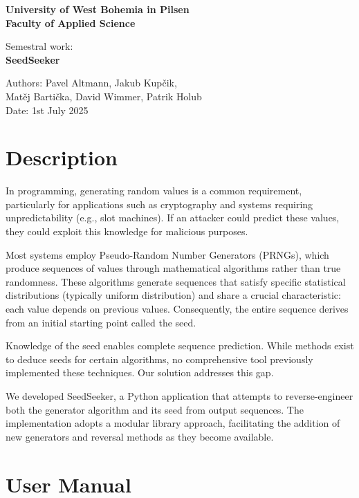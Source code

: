 \documentclass[12pt, a4paper]{report}
\begin{document}

\begin{center}
    \Large{\textbf{University of West Bohemia in Pilsen\\Faculty of Applied Science}}

    \vspace{\fill}
    \normalsize{Semestral work:\\}
    \Large{\textbf{SeedSeeker}}

    \vspace{\fill}
    \normalsize{Authors: Pavel Altmann, Jakub Kupčik,\\Matěj Bartička, David Wimmer, Patrik Holub\\Date: 1st July 2025}
\end{center}
\newpage

\setcounter{page}{2}
\tableofcontents
\newpage

\chapter{Description}
In programming, generating random values is a common requirement, particularly for applications such as 
cryptography and systems requiring unpredictability (e.g., slot machines). If an attacker could predict 
these values, they could exploit this knowledge for malicious purposes.

Most systems employ Pseudo-Random Number Generators (PRNGs), which produce sequences of values through 
mathematical algorithms rather than true randomness. These algorithms generate sequences that satisfy specific 
statistical distributions (typically uniform distribution) and share a crucial characteristic: each value depends 
on previous values. Consequently, the entire sequence derives from an initial starting point called the seed.

Knowledge of the seed enables complete sequence prediction. While methods exist to deduce seeds for certain 
algorithms, no comprehensive tool previously implemented these techniques. Our solution addresses this gap.

We developed SeedSeeker, a Python application that attempts to reverse-engineer both the generator algorithm and 
its seed from output sequences. The implementation adopts a modular library approach, facilitating the 
addition of new generators and reversal methods as they become available.

\chapter{User Manual}
\end{document}
